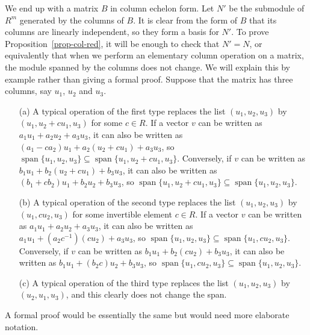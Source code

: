 \documentclass{amsart}
\newcommand{\spn}       {\operatorname{span}}
\newcommand{\sse}       {\subseteq}
\renewcommand{\:}{\colon}
\theoremstyle{definition}
\begin{document}
We end up with a matrix $B$ in column echelon form.  Let $N'$ be the
submodule of $R^m$ generated by the columns of $B$.  It is clear from
the form of $B$ that its columns are linearly independent, so they
form a basis for $N'$.  To prove Proposition~\ref{prop-col-red}, it
will be enough to check that $N'=N$, or equivalently that when we
perform an elementary column operation on a matrix, the module spanned
by the columns does not change.  We will explain this by example
rather than giving a formal proof.  Suppose that the matrix has three
columns, say $u_1$, $u_2$ and $u_3$.
\begin{itemize}
 \item[(a)] A typical operation of the first type replaces the list
  $(u_1,u_2,u_3)$ by $(u_1,u_2+c u_1,u_3)$ for some $c\in R$.  If a
  vector $v$ can be written as $a_1u_1+a_2u_2+a_3u_3$, it can also be
  written as $(a_1-ca_2)u_1+a_2(u_2+cu_1)+a_3u_3$, so
  $\spn\{u_1,u_2,u_3\}\sse\spn\{u_1,u_2+cu_1,u_3\}$.  Conversely, if
  $v$ can be written as $b_1u_1+b_2(u_2+cu_1)+b_3u_3$, it can also be
  written as $(b_1+cb_2)u_1+b_2u_2+b_3u_3$, so
  $\spn\{u_1,u_2+cu_1,u_3\}\sse\spn\{u_1,u_2,u_3\}$.
 \item[(b)] A typical operation of the second type replaces the list
  $(u_1,u_2,u_3)$ by $(u_1,cu_2,u_3)$ for some invertible element
  $c\in R$.  If a vector $v$ can be written as $a_1u_1+a_2u_2+a_3u_3$,
  it can also be written as $a_1u_1+(a_2c^{-1})(cu_2)+a_3u_3$, so
  $\spn\{u_1,u_2,u_3\}\sse\spn\{u_1,cu_2,u_3\}$.  Conversely, if $v$
  can be written as $b_1u_1+b_2(cu_2)+b_3u_3$, it can also be written
  as $b_1u_1+(b_2c)u_2+b_3u_3$, so
  $\spn\{u_1,cu_2,u_3\}\sse\spn\{u_1,u_2,u_3\}$.
 \item[(c)] A typical operation of the third type replaces the list
  $(u_1,u_2,u_3)$ by $(u_2,u_1,u_3)$, and this clearly does not change
  the span.
\end{itemize}
A formal proof would be essentially the same but would need more
elaborate notation.
\end{document}
